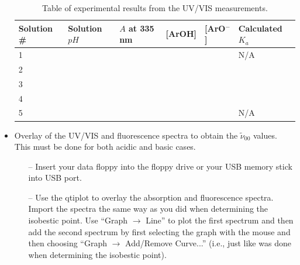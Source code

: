 \documentclass[byrevtex,amssymb,aps,pra,floatfix,letterpaper]{revtex4}
\begin{document}
\begin{itemize}
\begin{table}[!htp]
\caption{Table of experimental results from the UV/VIS measurements.}
\begin{tabular}{|l|l|l|l|l|l|}
\hline
Solution \# & Solution $pH$ & $A$ at 335 nm & [ArOH] & [ArO$^-$] & Calculated $K_a$\\
\hline
1 & \hspace{2cm} & \hspace{2cm} & \hspace{2cm} & \hspace{2cm} & N/A\\
\hline
2 & \hspace{2cm} & \hspace{2cm} & \hspace{2cm} & \hspace{2cm} & \hspace{2cm}\\
\hline
3 & \hspace{2cm} & \hspace{2cm} & \hspace{2cm} & \hspace{2cm} & \hspace{2cm}\\
\hline
4 & \hspace{2cm} & \hspace{2cm} & \hspace{2cm} & \hspace{2cm} & \hspace{2cm}\\
\hline
5 & \hspace{2cm} & \hspace{2cm} & \hspace{2cm} & \hspace{2cm} & N/A\\
\hline
\end{tabular}
\label{table2}
\end{table}

\item Overlay of the UV/VIS and fluorescence spectra to obtain the $\tilde{\nu}_{00}$ values. This must be done for both acidic and basic cases.\\

\begin{itemize}
\item[--] Insert your data floppy into the floppy drive or your USB memory stick into USB port.

\item[--] Use the qtiplot to overlay the absorption and fluorescence spectra. Import the spectra the same way as you did when determining the isobestic point. Use ``Graph $\rightarrow$ Line'' to plot the first spectrum and then add the second spectrum by first selecting the graph with the mouse and then choosing ``Graph $\rightarrow$ Add/Remove Curve...'' (i.e., just like was done when determining the isobestic point).


\end{itemize}
\end{itemize}
\end{document}
